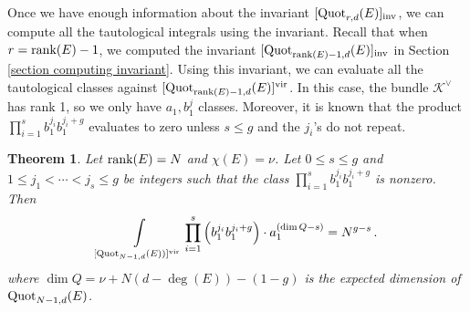 \documentclass[11pt]{amsart}
\newtheorem{theorem}{Theorem}
\theoremstyle{remark}
\newcommand{\K}{\mathcal{K}}
\newcommand{\rk}{\textnormal{rank}}
\newcommand{\quot}[0]{\textnormal{Quot}}
\newcommand{\vir}[0]{\textnormal{vir}}
\newcommand{\inv}[0]{\textnormal{inv}}
\numberwithin{theorem}{section}
\begin{document}
\vspace{.2cm}
Once we have enough information about the invariant 
$[\quot_{r,d}(E)]_\inv$, we can compute all the tautological integrals using the invariant.
Recall that when $r=\rk(E)-1$, 
we computed the invariant $[\quot_{\rk(E)-1,d}(E)]_\inv$ 
in Section \ref{section computing invariant}.
Using this invariant,
we can evaluate all the tautological classes against
$[\quot_{\rk(E)-1,d}(E)]^\vir$.
In this case, the bundle $\K^\vee$ has rank 1, so we only have
$a_1, b_1^j$ classes.
Moreover, it is known that the product $\prod_{i=1}^s b_1^{j_i}b_1^{j_i+g}$
evaluates to zero unless $s \leqslant g$ and the $j_i$'s do not repeat.
\begin{theorem}\label{theorem intersections on Quot N-1}
    Let $\rk(E)=N$ and $\chi(E) = \nu$.
    Let $0 \leqslant s \leqslant g$ and $1 \leqslant j_1 < \cdots < j_s \leqslant g$ be integers
    such that the class $\prod_{i=1}^s b_1^{j_i}b_1^{j_i+g}$
    is nonzero.
    Then
    \begin{equation*}
        \int\limits_{[\quot_{N-1,d}(E))]^\vir} 
        \prod_{i=1}^s \left(b_1^{j_i}b_1^{j_i+g}\right) \cdot 
        a_1^{(\dim Q-s)} = N^{g-s}\,.
    \end{equation*}
    where $\dim Q = \nu + N(d - \deg(E)) - (1-g)$ is the expected dimension of $\quot_{N-1,d}(E)$.
\end{theorem}
\end{document}
